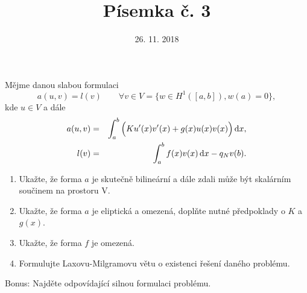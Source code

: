 \documentclass{article}
\def\d{{\rm{d}}}
\begin{document}
\title{Písemka č. 3}
\date{26. 11. 2018}
\author{}
\maketitle

\noindent
Mějme danou slabou formulaci
\begin{equation*}
    a(u,v) = l(v) \qquad \forall v\in V=\{w\in H^1([a,b]), w(a)=0\},
\end{equation*}
kde $u\in V$ a dále
\begin{eqnarray*}
    a(u,v) &=& \int_a^b \Big( Ku'(x)v'(x) + g(x)u(x)v(x) \Big)\, \d x, \\
    l(v) &=& \int_a^b f(x)v(x)\, \d x - q_N v(b).
\end{eqnarray*}

\begin{enumerate}
\item Ukažte, že forma $a$ je skutečně bilineární a dále zdali může být skalárním součinem na prostoru V.
\item Ukažte, že forma $a$ je eliptická a omezená, doplňte nutné předpoklady o $K$ a $g(x)$.
\item Ukažte, že forma $f$ je omezená.
\item Formulujte Laxovu-Milgramovu větu o existenci řešení daného problému.
\end{enumerate}

Bonus: Najděte odpovídající silnou formulaci problému.
\end{document}
